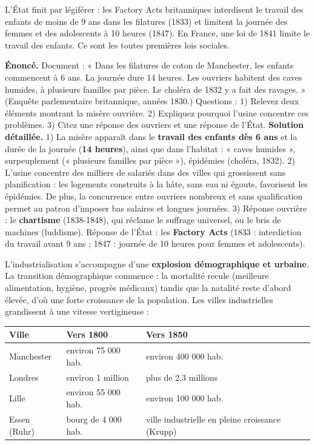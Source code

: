 \documentclass[11pt]{article}
\newcommand{\cle}[1]{{\popxbold\color{popdark}#1}}
\newcounter{popsec}
\newcounter{popsub}
\newcommand{\courssub}[1]{%
  \stepcounter{popsub}%
  \par\vspace{9pt}\noindent{\popxbold\fontsize{11.5}{13}\selectfont\color{popink}{\color{poporange}\thepopsec.\thepopsub}\hspace{6pt}#1}\par\nopagebreak\vspace{4pt}
}
\begin{document}
L'État finit par légiférer : les \cle{Factory Acts} britanniques interdisent le travail des enfants de moins de 9 ans dans les filatures (1833) et limitent la journée des femmes et des adolescents à 10 heures (1847). En France, une loi de 1841 limite le travail des enfants. Ce sont les toutes premières lois sociales.

\begin{exoresolu}
\textbf{Énoncé.} Document : « Dans les filatures de coton de Manchester, les enfants commencent à 6 ans. La journée dure 14 heures. Les ouvriers habitent des caves humides, à plusieurs familles par pièce. Le choléra de 1832 y a fait des ravages. » (Enquête parlementaire britannique, années 1830.) Questions : 1) Relevez deux éléments montrant la misère ouvrière. 2) Expliquez pourquoi l'usine concentre ces problèmes. 3) Citez une réponse des ouvriers et une réponse de l'État.
\tcblower
\textbf{Solution détaillée.}
1) La misère apparaît dans le \textbf{travail des enfants dès 6 ans} et la durée de la journée (\textbf{14 heures}), ainsi que dans l'habitat : « caves humides », surpeuplement (« plusieurs familles par pièce »), épidémies (choléra, 1832).
2) L'usine concentre des milliers de salariés dans des villes qui grossissent sans planification : les logements construits à la hâte, sans eau ni égouts, favorisent les épidémies. De plus, la concurrence entre ouvriers nombreux et sans qualification permet au patron d'imposer bas salaires et longues journées.
3) Réponse ouvrière : le \textbf{chartisme} (1838-1848), qui réclame le suffrage universel, ou le bris de machines (luddisme). Réponse de l'État : les \textbf{Factory Acts} (1833 : interdiction du travail avant 9 ans ; 1847 : journée de 10 heures pour femmes et adolescents).
\end{exoresolu}

\courssub{L'impact démographique et urbain}

L'industrialisation s'accompagne d'une \textbf{explosion démographique et urbaine}. La \cle{transition démographique} commence : la mortalité recule (meilleure alimentation, hygiène, progrès médicaux) tandis que la natalité reste d'abord élevée, d'où une forte croissance de la population. Les villes industrielles grandissent à une vitesse vertigineuse :

\begin{center}
\begin{tabularx}{\linewidth}{|l|X|X|}
\hline
\rowcolor{popblueL} \textbf{Ville} & \textbf{Vers 1800} & \textbf{Vers 1850} \\
\hline
Manchester & environ 75 000 hab. & environ 400 000 hab. \\
\hline
Londres & environ 1 million & plus de 2,3 millions \\
\hline
Lille & environ 55 000 hab. & environ 100 000 hab. \\
\hline
Essen (Ruhr) & bourg de 4 000 hab. & ville industrielle en pleine croissance (Krupp) \\
\hline
\end{tabularx}
\end{center}
\end{document}
